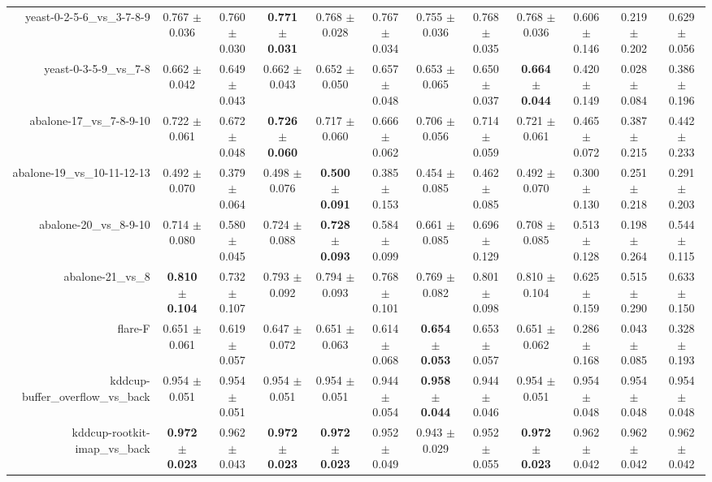 \begin{table}[!ht]
{\begin{tabular}{r c c c c c c c c c c c}
yeast-0-2-5-6\_vs\_3-7-8-9 & 0.767 $\pm$ 0.036 & 0.760 $\pm$ 0.030 & \textbf{0.771 $\pm$ 0.031} & 0.768 $\pm$ 0.028 & 0.767 $\pm$ 0.034 & 0.755 $\pm$ 0.036 & 0.768 $\pm$ 0.035 & 0.768 $\pm$ 0.036 & 0.606 $\pm$ 0.146 & 0.219 $\pm$ 0.202 & 0.629 $\pm$ 0.056 \\
yeast-0-3-5-9\_vs\_7-8 & 0.662 $\pm$ 0.042 & 0.649 $\pm$ 0.043 & 0.662 $\pm$ 0.043 & 0.652 $\pm$ 0.050 & 0.657 $\pm$ 0.048 & 0.653 $\pm$ 0.065 & 0.650 $\pm$ 0.037 & \textbf{0.664 $\pm$ 0.044} & 0.420 $\pm$ 0.149 & 0.028 $\pm$ 0.084 & 0.386 $\pm$ 0.196 \\
abalone-17\_vs\_7-8-9-10 & 0.722 $\pm$ 0.061 & 0.672 $\pm$ 0.048 & \textbf{0.726 $\pm$ 0.060} & 0.717 $\pm$ 0.060 & 0.666 $\pm$ 0.062 & 0.706 $\pm$ 0.056 & 0.714 $\pm$ 0.059 & 0.721 $\pm$ 0.061 & 0.465 $\pm$ 0.072 & 0.387 $\pm$ 0.215 & 0.442 $\pm$ 0.233 \\
abalone-19\_vs\_10-11-12-13 & 0.492 $\pm$ 0.070 & 0.379 $\pm$ 0.064 & 0.498 $\pm$ 0.076 & \textbf{0.500 $\pm$ 0.091} & 0.385 $\pm$ 0.153 & 0.454 $\pm$ 0.085 & 0.462 $\pm$ 0.085 & 0.492 $\pm$ 0.070 & 0.300 $\pm$ 0.130 & 0.251 $\pm$ 0.218 & 0.291 $\pm$ 0.203 \\
abalone-20\_vs\_8-9-10 & 0.714 $\pm$ 0.080 & 0.580 $\pm$ 0.045 & 0.724 $\pm$ 0.088 & \textbf{0.728 $\pm$ 0.093} & 0.584 $\pm$ 0.099 & 0.661 $\pm$ 0.085 & 0.696 $\pm$ 0.129 & 0.708 $\pm$ 0.085 & 0.513 $\pm$ 0.128 & 0.198 $\pm$ 0.264 & 0.544 $\pm$ 0.115 \\
abalone-21\_vs\_8 & \textbf{0.810 $\pm$ 0.104} & 0.732 $\pm$ 0.107 & 0.793 $\pm$ 0.092 & 0.794 $\pm$ 0.093 & 0.768 $\pm$ 0.101 & 0.769 $\pm$ 0.082 & 0.801 $\pm$ 0.098 & 0.810 $\pm$ 0.104 & 0.625 $\pm$ 0.159 & 0.515 $\pm$ 0.290 & 0.633 $\pm$ 0.150 \\
flare-F & 0.651 $\pm$ 0.061 & 0.619 $\pm$ 0.057 & 0.647 $\pm$ 0.072 & 0.651 $\pm$ 0.063 & 0.614 $\pm$ 0.068 & \textbf{0.654 $\pm$ 0.053} & 0.653 $\pm$ 0.057 & 0.651 $\pm$ 0.062 & 0.286 $\pm$ 0.168 & 0.043 $\pm$ 0.085 & 0.328 $\pm$ 0.193 \\
kddcup-buffer\_overflow\_vs\_back & 0.954 $\pm$ 0.051 & 0.954 $\pm$ 0.051 & 0.954 $\pm$ 0.051 & 0.954 $\pm$ 0.051 & 0.944 $\pm$ 0.054 & \textbf{0.958 $\pm$ 0.044} & 0.944 $\pm$ 0.046 & 0.954 $\pm$ 0.051 & 0.954 $\pm$ 0.048 & 0.954 $\pm$ 0.048 & 0.954 $\pm$ 0.048 \\
kddcup-rootkit-imap\_vs\_back & \textbf{0.972 $\pm$ 0.023} & 0.962 $\pm$ 0.043 & \textbf{0.972 $\pm$ 0.023} & \textbf{0.972 $\pm$ 0.023} & 0.952 $\pm$ 0.049 & 0.943 $\pm$ 0.029 & 0.952 $\pm$ 0.055 & \textbf{0.972 $\pm$ 0.023} & 0.962 $\pm$ 0.042 & 0.962 $\pm$ 0.042 & 0.962 $\pm$ 0.042 \\

\end{tabular}}
\end{table}
